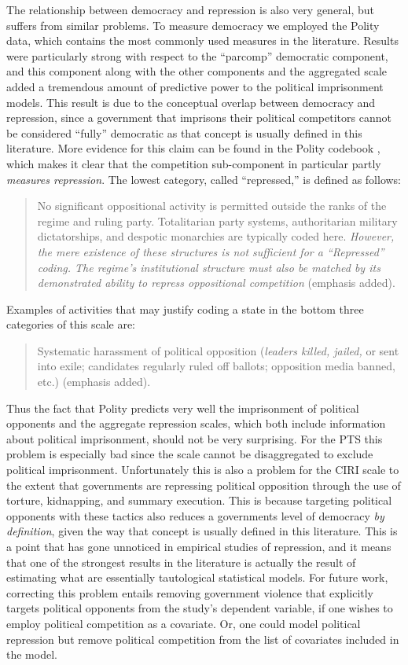 \documentclass[12pt]{article}
\begin{document}
The relationship between democracy and repression is also very general, but suffers from similar problems. To measure democracy we employed the Polity data, which contains the most commonly used measures in the literature. Results were particularly strong with respect to the ``parcomp'' democratic component, and this component along with the other components and the aggregated scale added a tremendous amount of predictive power to the political imprisonment models. This result is due to the conceptual overlap between democracy and repression, since a government that imprisons their political competitors cannot be considered ``fully'' democratic as that concept is usually defined in this literature. More evidence for this claim can be found in the Polity codebook \citep[][p.\ 26]{MarshallJaggers2009}, which makes it clear that the competition sub-component in particular partly {\it measures repression}. The lowest category, called ``repressed,'' is defined as follows:
\begin{quote}
No significant oppositional activity is permitted outside the ranks of the regime and ruling party. Totalitarian party systems, authoritarian military dictatorships, and despotic monarchies are typically coded here. {\it However, the mere existence of these structures is not sufficient for a ``Repressed'' coding. The regime's institutional structure must also be matched by its demonstrated ability to repress oppositional competition} (emphasis added).
\end{quote}
\noindent
Examples of activities that may justify coding a state in the bottom three categories of this scale are:
\begin{quote}
Systematic harassment of political opposition ({\em leaders killed, jailed,} or sent into exile; candidates regularly ruled off ballots; opposition media banned, etc.) (emphasis added). 
\end{quote}
\noindent
Thus the fact that Polity predicts very well the imprisonment of political opponents and the aggregate repression scales, which both include information about political imprisonment, should not be very surprising. For the PTS this problem is especially bad since the scale cannot be disaggregated to exclude political imprisonment. Unfortunately this is also a problem for the CIRI scale to the extent that governments are repressing political opposition through the use of torture, kidnapping, and summary execution. This is because targeting political opponents with these tactics also reduces a governments level of democracy {\it by definition}, given the way that concept is usually defined in this literature. This is a point that has gone unnoticed in empirical studies of repression, and it means that one of the strongest results in the literature is actually the result of estimating what are essentially tautological statistical models. For future work, correcting this problem entails removing government violence that explicitly targets political opponents from the study's dependent variable, if one wishes to employ political competition as a covariate. Or, one could model political repression but remove political competition from the list of covariates included in the model. 
\end{document}
